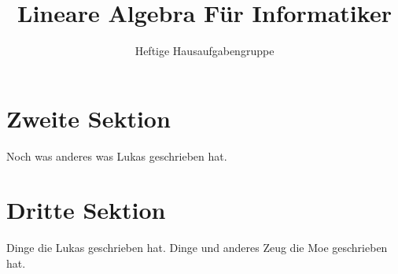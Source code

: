\documentclass[12pt,a4paper]{article}
\author{Heftige Hausaufgabengruppe}
\title{Lineare Algebra Für Informatiker}
\begin{document}
\maketitle
\tableofcontents
\section{Zweite Sektion}
Noch was anderes was Lukas geschrieben hat.
\section{Dritte Sektion}
Dinge die Lukas geschrieben hat.
Dinge und anderes Zeug die Moe geschrieben hat.
\end{document}
